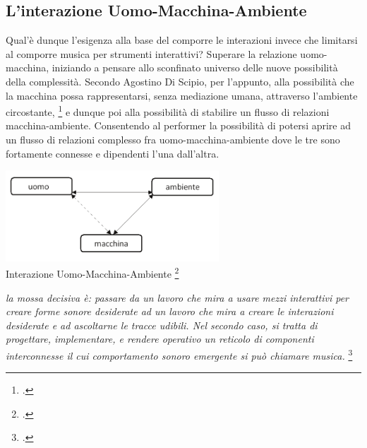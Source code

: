 \subsection{L'interazione Uomo-Macchina-Ambiente}
\label{sec:L'interazione Uomo-Macchina-Ambiente}

Qual'è dunque l'esigenza alla base del comporre le interazioni invece 
che limitarsi al comporre musica per strumenti interattivi? 
Superare la relazione uomo-macchina, iniziando a pensare allo sconfinato universo 
delle nuove possibilità della complessità.
Secondo Agostino Di Scipio, per l'appunto, alla possibilità che la macchina possa rappresentarsi, 
senza mediazione umana, attraverso l'ambiente circostante, \footcite{discipio_polverisonore_2016}
e dunque poi alla possibilità di stabilire un flusso di relazioni macchina-ambiente. 
Consentendo al performer la possibilità di potersi aprire ad un flusso di relazioni 
complesso fra uomo-macchina-ambiente dove le tre sono fortamente connesse e dipendenti 
l'una dall'altra.

\begin{center}
\vspace{0.5cm}
\includegraphics[width=8cm]{figures/uomo_macchina_ambiente.png} \\
{Interazione Uomo-Macchina-Ambiente \footcite{discipio_polverisonore_2016}} \\ 
\vspace{0.5cm}
\end{center}

\begin{center}
\vspace{0.5cm}
\textit{la mossa decisiva è: passare da un lavoro che mira a usare mezzi interattivi per creare forme sonore desiderate ad
un lavoro che mira a creare le interazioni desiderate e ad ascoltarne le tracce udibili. Nel secondo caso, si tratta
di progettare, implementare, e rendere operativo un reticolo di componenti interconnesse il cui comportamento
sonoro emergente si può chiamare musica.} \footcite{discipio_polverisonore_2016}
\vspace{0.5cm}
\end{center}

